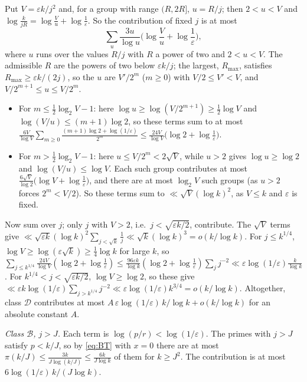 \documentclass[11pt]{amsart}
\theoremstyle{remark}
\begin{document}
Put $V=\varepsilon k/j^2$ and, for a group with range $(R,2R]$, $u=R/j$; then $2<u<V$ and $\log\frac{k}{jR}=\log\frac Vu+\log\frac1\varepsilon$. So the contribution of fixed $j$ is at most
\[\sum_u\frac{3u}{\log u}\Big(\log\frac Vu+\log\frac1\varepsilon\Big),\]
where $u$ runs over the values $R/j$ with $R$ a power of two and $2<u<V$. The admissible $R$ are the powers of two below $\varepsilon k/j$; the largest, $R_{\max}$, satisfies $R_{\max}\ge\varepsilon k/(2j)$, so the $u$ are $V'/2^m$ ($m\ge0$) with $V/2\le V'<V$, and $V/2^{m+1}\le u\le V/2^m$.
\begin{itemize}
\item For $m\le\frac12\log_2V-1$: here $\log u\ge\log(V/2^{m+1})\ge\frac12\log V$ and $\log(V/u)\le(m+1)\log2$, so these terms sum to at most $\frac{6V}{\log V}\sum_{m\ge0}\frac{(m+1)\log2+\log(1/\varepsilon)}{2^m}\le\frac{24V}{\log V}\big(\log2+\log\frac1\varepsilon\big)$.
\item For $m>\frac12\log_2V-1$: here $u\le V/2^m<2\sqrt V$, while $u>2$ gives $\log u\ge\log2$ and $\log(V/u)\le\log V$. Each such group contributes at most $\frac{6\sqrt V}{\log2}\big(\log V+\log\frac1\varepsilon\big)$, and there are at most $\log_2V$ such groups (as $u>2$ forces $2^m<V/2$). So these terms sum to $\ll\sqrt V(\log k)^2$, as $V\le k$ and $\varepsilon$ is fixed.
\end{itemize}
Now sum over $j$; only $j$ with $V>2$, i.e.\ $j<\sqrt{\varepsilon k/2}$, contribute. The $\sqrt V$ terms give $\ll\sqrt{\varepsilon k}(\log k)^2\sum_{j<\sqrt k}\frac1j\ll\sqrt k(\log k)^3=o(k/\log k)$. For $j\le k^{1/4}$, $\log V\ge\log(\varepsilon\sqrt k)\ge\frac14\log k$ for large $k$, so $\sum_{j\le k^{1/4}}\frac{24V}{\log V}(\log2+\log\frac1\varepsilon)\le\frac{96\varepsilon k}{\log k}(\log2+\log\frac1\varepsilon)\sum_jj^{-2}\ll\varepsilon\log(1/\varepsilon)\frac{k}{\log k}$. For $k^{1/4}<j<\sqrt{\varepsilon k/2}$, $\log V\ge\log2$, so these give $\ll\varepsilon k\log(1/\varepsilon)\sum_{j>k^{1/4}}j^{-2}\ll\varepsilon\log(1/\varepsilon)k^{3/4}=o(k/\log k)$. Altogether, class $\mathcal D$ contributes at most $A\,\varepsilon\log(1/\varepsilon)\,k/\log k+o(k/\log k)$ for an absolute constant $A$.

\emph{Class $\mathcal B$, $j>J$.} Each term is $\log(p/r)<\log(1/\varepsilon)$. The primes with $j>J$ satisfy $p<k/J$, so by \eqref{eq:BT} with $x=0$ there are at most $\pi(k/J)\le\frac{3k}{J\log(k/J)}\le\frac{6k}{J\log k}$ of them for $k\ge J^2$. The contribution is at most $6\log(1/\varepsilon)\,k/(J\log k)$.
\end{document}
